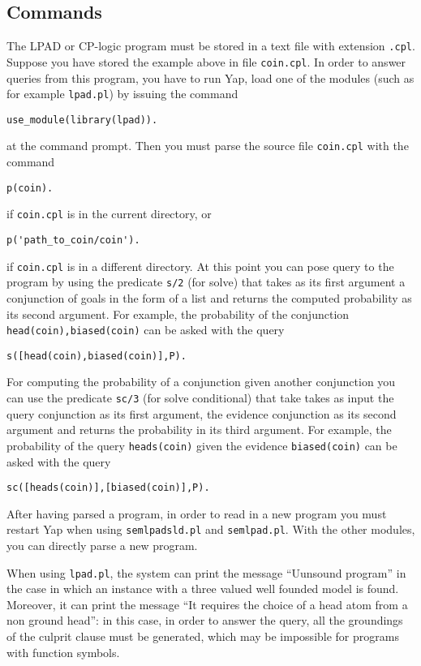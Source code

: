 \documentclass[a4paper,10pt]{article}
\begin{document}
\subsection{Commands}
The LPAD or CP-logic program must be stored in a text file with extension \texttt{.cpl}. Suppose you have stored the example above in file \texttt{coin.cpl}. 
In order to answer queries from this program, you have to run Yap,
load one of the modules (such as for example \texttt{lpad.pl}) by issuing  the command
\begin{verbatim}
use_module(library(lpad)).
\end{verbatim}
at the command prompt.
Then you must parse the source file \texttt{coin.cpl}  with the command
\begin{verbatim}
p(coin).
\end{verbatim}
if \texttt{coin.cpl} is in the current directory, or 
\begin{verbatim}
p('path_to_coin/coin').
\end{verbatim}
if \texttt{coin.cpl} is in a different directory.
At this point you can pose query to the program by using the predicate \texttt{s/2} (for solve) that takes as its first argument a conjunction of goals in the form of a list and returns the computed probability as its second argument. For example, the probability of the conjunction \texttt{head(coin),biased(coin)} can be asked with the query
\begin{verbatim}
s([head(coin),biased(coin)],P).
\end{verbatim}
For computing the probability of a conjunction given another conjunction you can use the predicate \texttt{sc/3} (for solve conditional) that take takes as input the query conjunction as its first argument, the evidence conjunction as its second argument and returns the probability in its third argument.
For example, the probability of  the query \texttt{heads(coin)} given the evidence \texttt{biased(coin)} can be asked with the query
\begin{verbatim}
sc([heads(coin)],[biased(coin)],P).
\end{verbatim}
After having parsed a program, in order to read in a new program you must restart Yap when using 
\texttt{semlpadsld.pl} and \texttt{semlpad.pl}. With the other modules, you can directly parse a new program.

When using \texttt{lpad.pl}, the system can print the message ``Uunsound program'' in the case in which an instance with a three valued well founded model is found.  Moreover, it can print the message ``It requires the choice of a head atom from a non ground head'': in this case, in order to answer the query, all the groundings of the culprit clause must be generated, which may be impossible for programs with function symbols. 
\end{document}
